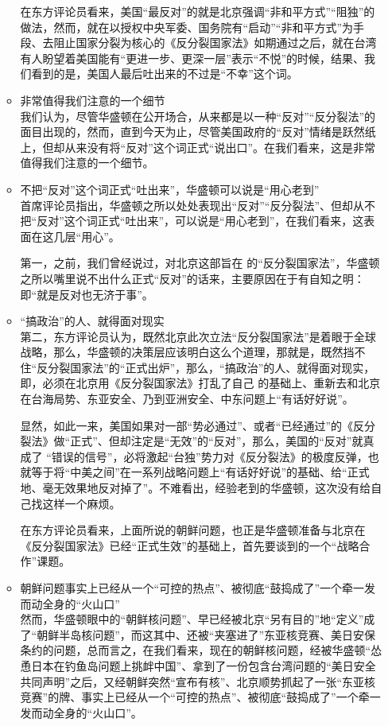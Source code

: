 \documentclass[a4paper,11pt]{article}
\begin{document}
\begin{itemize}
\begin{itemize}
    在东方评论员看来，美国“最反对”的就是北京强调“非和平方式”“阻独”的做法，然而，就在以授权中央军委、国务院有“启动”“非和平方式”为手段、去阻止国家分裂为核心的《反分裂国家法》如期通过之后，就在台湾有人盼望着美国能有“更进一步、更深一层”表示“不悦”的时候，结果、我们看到的是，美国人最后吐出来的不过是“不幸”这个词。
 

\item 非常值得我们注意的一个细节\\
\label{sec-4_2_2}%
我们认为，尽管华盛顿在公开场合，从来都是以一种“反对”“反分裂法”的面目出现的，然而，直到今天为止，尽管美国政府的“反对”情绪是跃然纸上，但却从来没有将“反对”这个词正式“说出口”。在我们看来，这是非常值得我们注意的一个细节。
 

\item 不把“反对”这个词正式“吐出来”，华盛顿可以说是“用心老到”\\
\label{sec-4_2_3}%
首席评论员指出，华盛顿之所以处处表现出“反对”“反分裂法”、但却从不把“反对”这个词正式“吐出来”，可以说是“用心老到”，在我们看来，这表面在这几层“用心”。

    第一，之前，我们曾经说过，对北京这部旨在
    的“反分裂国家法”，华盛顿之所以嘴里说不出什么正式“反对”的话来，主要原因在于有自知之明：即“就是反对也无济于事”。
 

\item “搞政治”的人、就得面对现实\\
\label{sec-4_2_4}%
第二，东方评论员认为，既然北京此次立法“反分裂国家法”是着眼于全球战略，那么，华盛顿的决策层应该明白这么个道理，那就是，既然挡不住“反分裂国家法”的“正式出炉”，那么，“搞政治”的人、就得面对现实，即，必须在北京用《反分裂国家法》打乱了自己
    的基础上、重新去和北京在台海局势、东亚安全、乃到亚洲安全、中东问题上“有话好好说”。

    显然，如此一来，美国如果对一部“势必通过”、或者“已经通过”的《反分裂法》做“正式”、但却注定是“无效”的“反对”，那么，美国的“反对”就真成了 “错误的信号”，必将激起“台独”势力对《反分裂法》的极度反弹，也就等于将“中美之间”在一系列战略问题上“有话好好说”的基础、给“正式地、毫无效果地反对掉了”。不难看出，经验老到的华盛顿，这次没有给自己找这样一个麻烦。

    在东方评论员看来，上面所说的朝鲜问题，也正是华盛顿准备与北京在《反分裂国家法》已经“正式生效”的基础上，首先要谈到的一个“战略合作”课题。
 

\item 朝鲜问题事实上已经从一个“可控的热点”、被彻底“鼓捣成了”一个牵一发而动全身的“火山口”\\
\label{sec-4_2_5}%
然而，华盛顿眼中的“朝鲜核问题”、早已经被北京“另有目的”地“定义”成了“朝鲜半岛核问题”，而这其中、还被“夹塞进了”东亚核竞赛、美日安保条约的问题，总而言之，在我们看来，现在的朝鲜核问题，经被华盛顿“怂恿日本在钓鱼岛问题上挑衅中国”、拿到了一份包含台湾问题的“美日安全共同声明”之后，又经朝鲜突然“宣布有核”、北京顺势抓起了一张“东亚核竞赛”的牌、事实上已经从一个“可控的热点”、被彻底“鼓捣成了”一个牵一发而动全身的“火山口”。
 


\end{itemize}
\end{itemize}
\end{document}
